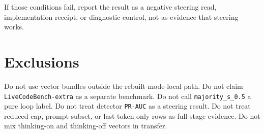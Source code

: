\documentclass[11pt]{article}
\begin{document}
If those conditions fail, report the result as a negative steering read,
implementation receipt, or diagnostic control, not as evidence that steering
works.

\section*{Exclusions}
Do not use vector bundles outside the rebuilt mode-local path. Do not claim
\texttt{LiveCodeBench-extra} as a separate benchmark. Do not call
\texttt{majority\_s\_0.5} a pure loop label. Do not treat detector
\texttt{PR-AUC} as a steering result. Do not treat reduced-cap, prompt-subset,
or last-token-only rows as full-stage evidence. Do not mix thinking-on and
thinking-off vectors in transfer.
\end{document}

